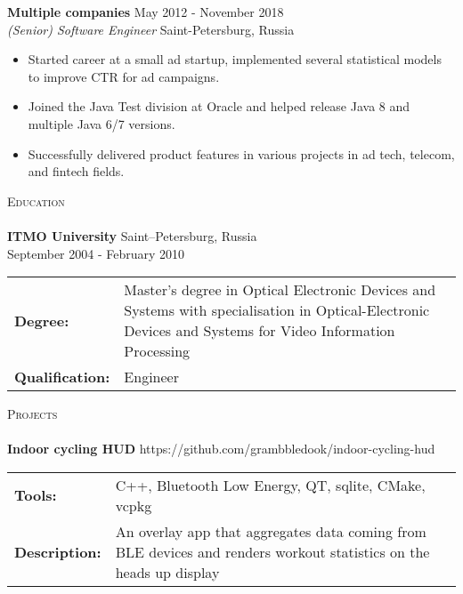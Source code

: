 \documentclass[a4paper]{article}
\makeatletter
\newcommand{\lineunder} {
    \vspace*{-8pt} \\
    \hspace*{-18pt} \hrulefill \\
}
\newcommand{\header} [1] {
        {\hspace*{-18pt}\vspace*{6pt} \textsc{#1}}
    \vspace*{-6pt} \lineunder
}
\newcommand{\employer} [4] {
    \textbf{#1} \hfill {#3} \\
    \textit{#2} \hfill {#4} \\
    \vspace{0mm}
}
\newcommand{\education} [5] {
    \textbf{#1} \hfill {#4} \\ {#5} \\ \vspace{1mm}
    \begin{tabularx}{\textwidth}{@{}p{3cm} X@{}}
    \textbf{Degree:} & {#2} \\
    \textbf{Qualification:} & {#3} \\
    \end{tabularx}
    \vspace{2mm}
}
\newcommand{\project} [4] {
    \textbf{#1} \hfill {#4} \\ \vspace{1mm}
    \begin{addmargin}[0em]{1em}
    \begin{tabularx}{\textwidth}{@{}p{3cm} X@{}}
    \textbf{Tools:} & {#2} \\
    \textbf{Description:} & {#3} \\
    \end{tabularx}
    \end{addmargin}
    \vspace{2mm}
}
\makeatother
\begin{document}
    \employer{Multiple companies}{(Senior) Software Engineer}{May 2012 - November 2018}{Saint-Petersburg, Russia}
    \begin{itemize}[itemsep=-1mm]
        \item Started career at a small ad startup, implemented several statistical models to improve CTR for ad campaigns.
        \item Joined the Java Test division at Oracle and helped release Java 8 and multiple Java 6/7 versions.
        \item Successfully delivered product features in various projects in ad tech, telecom, and fintech fields.
    \end{itemize}

    \header{Education}

    \education{ITMO University}
    {Master’s degree in Optical Electronic Devices and Systems with specialisation in Optical-Electronic Devices and Systems for Video Information Processing}
    {Engineer}
    {Saint–Petersburg, Russia}
    {September 2004 - February 2010}


    \header{Projects}
    \project{\textbf Indoor cycling HUD}
    {C++, Bluetooth Low Energy, QT, sqlite, CMake, vcpkg}
    {An overlay app that aggregates data coming from BLE devices and renders workout statistics on the heads up display}
    {https://github.com/grambbledook/indoor-cycling-hud}
%
%
\end{document}
